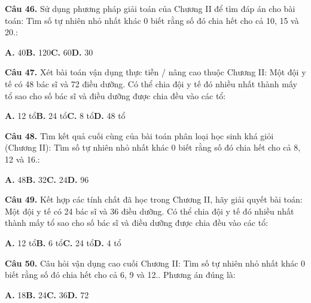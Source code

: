 \documentclass[11pt,a4paper]{article}
\begin{document}
\textbf{\color{primary} Câu 46.} Sử dụng phương pháp giải toán của Chương II để tìm đáp án cho bài toán: Tìm số tự nhiên nhỏ nhất khác 0 biết rằng số đó chia hết cho cả 10, 15 và 20.:\par
\hspace*{1.5em}\textbf{A.} 40\quad\quad \textbf{B.} 120\quad\quad \textbf{C.} 60\quad\quad \textbf{D.} 30\par\vspace{2pt}
\textbf{\color{primary} Câu 47.} Xét bài toán vận dụng thực tiễn / nâng cao thuộc Chương II: Một đội y tế có 48 bác sĩ và 72 điều dưỡng. Có thể chia đội y tế đó nhiều nhất thành mấy tổ sao cho số bác sĩ và điều dưỡng được chia đều vào các tổ:\par
\hspace*{1.5em}\textbf{A.} 12 tổ\quad\quad \textbf{B.} 24 tổ\quad\quad \textbf{C.} 8 tổ\quad\quad \textbf{D.} 48 tổ\par\vspace{2pt}
\textbf{\color{primary} Câu 48.} Tìm kết quả cuối cùng của bài toán phân loại học sinh khá giỏi (Chương II): Tìm số tự nhiên nhỏ nhất khác 0 biết rằng số đó chia hết cho cả 8, 12 và 16.:\par
\hspace*{1.5em}\textbf{A.} 48\quad\quad \textbf{B.} 32\quad\quad \textbf{C.} 24\quad\quad \textbf{D.} 96\par\vspace{2pt}
\textbf{\color{primary} Câu 49.} Kết hợp các tính chất đã học trong Chương II, hãy giải quyết bài toán: Một đội y tế có 24 bác sĩ và 36 điều dưỡng. Có thể chia đội y tế đó nhiều nhất thành mấy tổ sao cho số bác sĩ và điều dưỡng được chia đều vào các tổ:\par
\hspace*{1.5em}\textbf{A.} 12 tổ\quad\quad \textbf{B.} 6 tổ\quad\quad \textbf{C.} 24 tổ\quad\quad \textbf{D.} 4 tổ\par\vspace{2pt}
\textbf{\color{primary} Câu 50.} Câu hỏi vận dụng cao cuối Chương II: Tìm số tự nhiên nhỏ nhất khác 0 biết rằng số đó chia hết cho cả 6, 9 và 12.. Phương án đúng là:\par
\hspace*{1.5em}\textbf{A.} 18\quad\quad \textbf{B.} 24\quad\quad \textbf{C.} 36\quad\quad \textbf{D.} 72\par\vspace{2pt}
\end{document}
